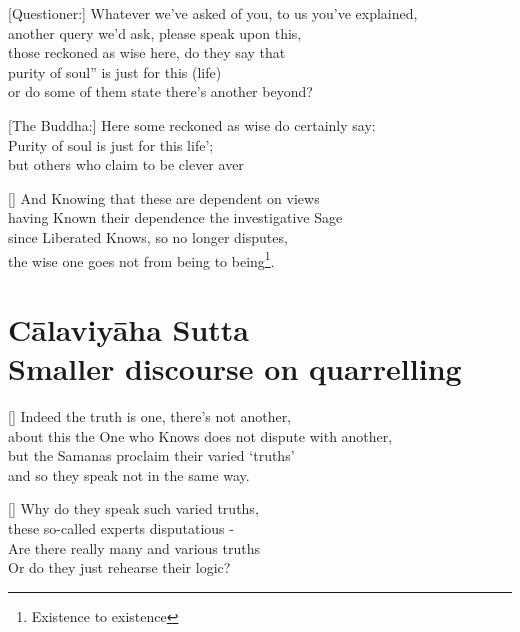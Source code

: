 \begin{MyDescription}{}[Questioner:]
Whatever we've asked of you, to us you've explained,\\
another query we'd ask, please speak upon this,\\
those reckoned as wise here, do they say that\\
purity of soul” is just for this (life)\\
or do some of them state there's another beyond?
\end{MyDescription}

\begin{MyDescription}{}[The Buddha:]
Here some reckoned as wise do certainly say:\\
Purity of soul is just for this life';\\
but others who claim to be clever aver\\
[line missing]
\end{MyDescription}

\begin{MyDescription}{}[]
And Knowing that these are dependent on views\\
having Known their dependence the investigative Sage\\
since Liberated Knows, so no longer disputes,\\
the wise one goes not from being to being\footnote{Existence to existence}.
\end{MyDescription}


\chapter{C\=alaviy\=aha Sutta\\ Smaller discourse on quarrelling}

\begin{MyDescription}{}[]
Indeed the truth is one, there's not another,\\
about this the One who Knows does not dispute with another,\\
but the Samanas proclaim their varied `truths'\\
and so they speak not in the same way.
\end{MyDescription}

\begin{MyDescription}{}[]
Why do they speak such varied truths,\\
these so-called experts disputatious -\\
Are there really many and various truths\\
Or do they just rehearse their logic?
\end{MyDescription}

